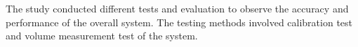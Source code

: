 The study conducted different tests and evaluation to observe the accuracy and performance of the overall system. The testing methods involved calibration test and volume measurement test of the system.




